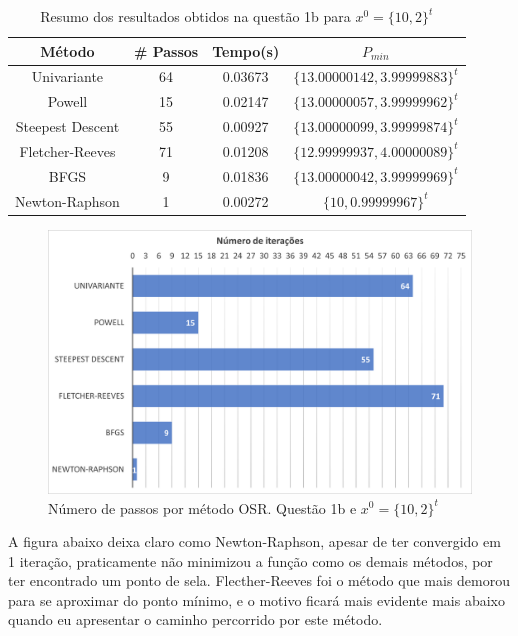 \documentclass[10pt, a4paper]{article}
\begin{document}
\begin{table}[H]
  \begin{center}
    \begin{tabular}{c|c|c|c}
      \textbf{Método} & \textbf{\# Passos} & \textbf{Tempo(s)} & \textbf{$P_{min}$}\\
      \hline
      Univariante & 64 & 0.03673 & $\{13.00000142, 3.99999883\}^t$\\
      Powell & 15 & 0.02147 & $\{13.00000057, 3.99999962\}^t$\\
      Steepest Descent & 55 & 0.00927 & $\{13.00000099, 3.99999874\}^t$\\
      Fletcher-Reeves & 71 & 0.01208 & $\{12.99999937, 4.00000089\}^t$\\
      BFGS & 9 & 0.01836 & $\{13.00000042, 3.99999969\}^t$\\
      Newton-Raphson & 1 & 0.00272 & $\{10, 0.99999967\}^t$\\
    \end{tabular}
  \end{center}
  \caption{Resumo dos resultados obtidos na questão 1b para $x^0 = \{10,2\}^t$}
\end{table}

\begin{figure}[H]
  \centering
  \includegraphics[scale=0.4]{figuras/q1b_passos_P1.PNG}
  \caption{Número de passos por método OSR. Questão 1b e $x^0 = \{10,2\}^t$ }
\end{figure}

A figura abaixo deixa claro como Newton-Raphson, apesar de ter convergido em 1 iteração, praticamente não minimizou
a função como os demais métodos, por ter encontrado um ponto de sela. Flecther-Reeves foi o método que mais demorou
para se aproximar do ponto mínimo, e o motivo ficará mais evidente mais abaixo quando eu apresentar o caminho percorrido
por este método.
\end{document}
